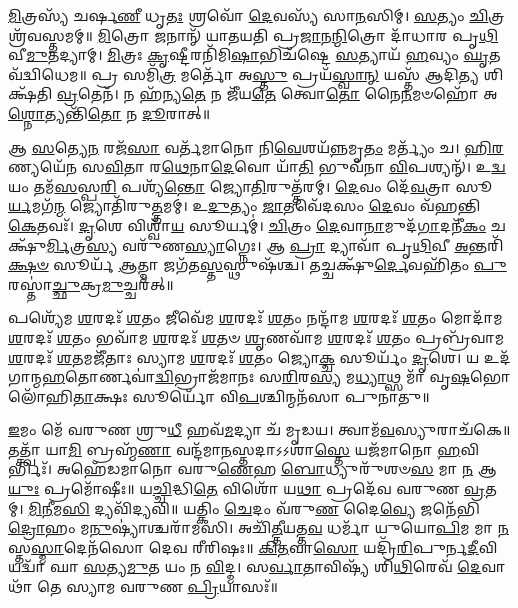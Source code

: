 \-\ul{𑌮𑌿}\-𑌤𑍍𑌰𑌸𑍍𑌯᳴ 𑌚𑌰𑍍\mbox{}𑌷\-\ul{𑌣𑍀} 𑌧𑍃\-\ul{𑌤𑌃} 𑌶𑍍𑌰𑌵𑍋᳴ \ul{𑌦𑍇}\-𑌵𑌸𑍍𑌯᳴ 𑌸𑌾\-\ul{𑌨}\-𑌸𑌿𑌮𑍍। \ul{𑌸}\-𑌤𑍍𑌯𑌂 \ul{𑌚𑌿}\-𑌤𑍍𑌰𑌶𑍍𑌰᳴𑌵𑌸𑍍𑌤𑌮𑌮𑍍॥ \ul{𑌮𑌿}\-𑌤𑍍𑌰𑍋 𑌜𑌨𑌾𑌨𑍍᳴ 𑌯𑌾𑌤𑌯𑌤𑌿 𑌪𑍍𑌰\-\ul{𑌜𑌾}\-𑌨\-\ul{𑌨𑍍𑌮𑌿}\-𑌤𑍍𑌰𑍋 𑌦𑌾᳴𑌧𑌾𑌰 𑌪𑍃\-\ul{𑌥𑌿}\-𑌵𑍀\-\ul{𑌮𑍁}\-𑌤𑌦𑍍𑌯𑌾𑌮𑍍। \ul{𑌮𑌿}\-𑌤𑍍𑌰𑌃 \ul{𑌕𑍃}\-𑌷𑍍𑌟𑍀𑌰𑌨𑌿᳴𑌮𑌿\-\ul{𑌷𑌾}\-𑌭𑌿𑌚᳴𑌷𑍍𑌟𑍇 \ul{𑌸}\-𑌤𑍍𑌯𑌾𑌯᳴ \ul{𑌹}\-𑌵𑍍𑌯𑌂 \ul{𑌘𑍃}\-𑌤𑌵᳴𑌦𑍍𑌵𑌿𑌧𑍇𑌮॥ 𑌪𑍍𑌰 𑌸𑌮𑌿᳴\-\ul{𑌤𑍍𑌰} 𑌮𑌰𑍍𑌤𑍋᳴ 𑌅\-\ul{𑌸𑍍𑌤𑍁} 𑌪𑍍𑌰𑌯᳴\-\ul{𑌸𑍍𑌵𑌾}\-\-\ul{𑌨𑍍} 𑌯𑌸𑍍𑌤᳴ 𑌆𑌦𑌿\-\ul{𑌤𑍍𑌯} 𑌶𑌿𑌕𑍍𑌷᳴𑌤𑌿 \ul{𑌵𑍍𑌰}\-𑌤𑍇𑌨᳴। 𑌨 𑌹᳴𑌨𑍍𑌯\-\ul{𑌤𑍇} 𑌨 𑌜𑍀᳴𑌯\-\ul{𑌤𑍇} 𑌤𑍍𑌵𑍋\-\ul{𑌤𑍋} 𑌨𑍈\-\ul{𑌨}\-𑌮𑍞𑌹𑍋᳴ 𑌅\-\ul{𑌶𑍍𑌨𑍋}\-𑌤𑍍𑌯𑌨𑍍𑌤𑌿᳴\-\ul{𑌤𑍋} 𑌨 \ul{𑌦𑍂}\-𑌰𑌾𑌤𑍍॥

𑌆 \ul{𑌸}\-𑌤𑍍𑌯𑍇\-\ul{𑌨} 𑌰𑌜᳴\-\ul{𑌸𑌾} 𑌵𑌰𑍍𑌤᳴𑌮𑌾𑌨𑍋 𑌨𑌿\-\ul{𑌵𑍇}\-𑌶𑌯᳴\-\ul{𑌨𑍍𑌨}\-𑌮𑍃\-\ul{𑌤𑌂} 𑌮𑌰𑍍𑌤𑍍𑌯𑌂᳴ 𑌚। \ul{𑌹𑌿}\-\-\ul{𑌰}\-𑌣𑍍𑌯𑌯𑍇᳴𑌨 𑌸\-\ul{𑌵𑌿}\-𑌤𑌾 𑌰\-\ul{𑌥𑍇}\-𑌨𑌾\-\ul{𑌦𑍇}\-𑌵𑍋 𑌯𑌾᳴\-\ul{𑌤𑌿} 𑌭𑍁𑌵᳴𑌨𑌾 \ul{𑌵𑌿}\-𑌪𑌶𑍍𑌯𑌨𑍍᳴। 𑌉\-\ul{𑌦𑍍𑌵}\-𑌯𑌂 𑌤𑌮᳴\-\ul{𑌸}\-𑌸𑍍𑌪\-\ul{𑌰𑌿} 𑌪𑌶𑍍𑌯᳴\-\ul{𑌨𑍍𑌤𑍋} 𑌜𑍍𑌯𑍋\-\ul{𑌤𑌿}\-𑌰𑍁𑌤𑍍𑌤᳴𑌰𑌮𑍍। \ul{𑌦𑍇}\-𑌵𑌂 𑌦𑍇᳴\-\ul{𑌵}\-𑌤𑍍𑌰𑌾 𑌸𑍂\-\ul{𑌰𑍍𑌯}\-𑌮𑌗᳴\-\ul{𑌨𑍍𑌮} 𑌜𑍍𑌯𑍋𑌤𑌿᳴𑌰𑍁\-\ul{𑌤𑍍𑌤}\-𑌮𑌮𑍍। 𑌉\-\ul{𑌦𑍁}\-𑌤𑍍𑌯𑌂 \ul{𑌜𑌾}\-𑌤𑌵𑍇᳴𑌦𑌸𑌂 \ul{𑌦𑍇}\-𑌵𑌂 𑌵᳴𑌹𑌨𑍍𑌤𑌿 \ul{𑌕𑍇}\-𑌤𑌵𑌃᳴। \ul{𑌦𑍃}\-𑌶𑍇 𑌵𑌿𑌶𑍍𑌵𑌾᳴\-\ul{𑌯} 𑌸𑍂𑌰𑍍𑌯𑌮𑍍॑। \ul{𑌚𑌿}\-𑌤𑍍𑌰𑌂 \ul{𑌦𑍇}\-𑌵𑌾\-\ul{𑌨𑌾}\-𑌮𑍁𑌦᳴\-\ul{𑌗𑌾}\-𑌦𑌨𑍀᳴\-\ul{𑌕𑌂} 𑌚𑌕𑍍𑌷𑍁᳴\-\ul{𑌰𑍍𑌮𑌿}\-𑌤𑍍𑌰\-\ul{𑌸𑍍𑌯} 𑌵𑌰𑍁᳴𑌣\-\ul{𑌸𑍍𑌯𑌾}\-𑌗𑍍𑌨𑍇𑌃। 𑌆 \ul{𑌪𑍍𑌰𑌾} 𑌦𑍍𑌯𑌾𑌵𑌾᳴ 𑌪𑍃\-\ul{𑌥𑌿}\-𑌵𑍀 \ul{𑌅}\-𑌨𑍍𑌤𑌰𑌿᳴\-\ul{𑌕𑍍𑌷}\-\-\ul{𑍞} 𑌸𑍂𑌰𑍍𑌯᳴ \ul{𑌆}\-𑌤𑍍𑌮𑌾 𑌜𑌗᳴𑌤\-\ul{𑌸𑍍𑌤}\-𑌸𑍍𑌥𑍁𑌷᳴𑌶𑍍𑌚। 𑌤𑌚𑍍𑌚𑌕𑍍𑌷𑍁᳴\-\ul{𑌰𑍍𑌦𑍇}\-𑌵𑌹𑌿᳴𑌤𑌂 \ul{𑌪𑍁}\-𑌰𑌸𑍍𑌤𑌾॑\-\ul{𑌚𑍍𑌛𑍁}\-𑌕𑍍𑌰\-\ul{𑌮𑍁}\-𑌚𑍍𑌚𑌰᳴𑌤𑍍॥

𑌪𑌶𑍍𑌯𑍇᳴𑌮 \ul{𑌶}\-𑌰𑌦𑌃᳴ \ul{𑌶}\-𑌤𑌂 𑌜𑍀𑌵𑍇᳴𑌮 \ul{𑌶}\-𑌰𑌦𑌃᳴ \ul{𑌶}\-𑌤𑌂 𑌨𑌨𑍍𑌦𑌾᳴𑌮 \ul{𑌶}\-𑌰𑌦𑌃᳴ \ul{𑌶}\-𑌤𑌂 𑌮𑍋𑌦𑌾᳴𑌮 \ul{𑌶}\-𑌰𑌦𑌃᳴ \ul{𑌶}\-𑌤𑌂 𑌭𑌵𑌾᳴𑌮 \ul{𑌶}\-𑌰𑌦𑌃᳴ \ul{𑌶}\-𑌤𑍞 \ul{𑌶𑍃}\-𑌣𑌵𑌾᳴𑌮 \ul{𑌶}\-𑌰𑌦𑌃᳴ \ul{𑌶}\-𑌤𑌂 𑌪𑍍𑌰𑌬𑍍𑌰᳴𑌵𑌾𑌮 \ul{𑌶}\-𑌰𑌦𑌃᳴ \ul{𑌶}\-𑌤𑌮𑌜𑍀᳴𑌤𑌾𑌃 𑌸𑍍𑌯𑌾𑌮 \ul{𑌶}\-𑌰𑌦𑌃᳴ \ul{𑌶}\-𑌤𑌂 𑌜𑍍𑌯𑍋\-\ul{𑌕𑍍𑌚} 𑌸𑍂𑌰𑍍𑌯𑌂᳴ \ul{𑌦𑍃}\-𑌶𑍇। 𑌯 𑌉𑌦᳴𑌗𑌾𑌨𑍍𑌮\-\ul{𑌹}\-𑌤𑍋𑌰𑍍𑌣𑌵𑌾॑\-\ul{𑌦𑍍𑌵𑌿}\-𑌭𑍍𑌰𑌾𑌜᳴𑌮𑌾𑌨𑌃 𑌸\-\ul{𑌰𑌿}\-𑌰\-\ul{𑌸𑍍𑌯} 𑌮\-\ul{𑌧𑍍𑌯𑌾}\-𑌥𑍍𑌸 𑌮𑌾᳴ 𑌵𑍃\-\ul{𑌷}\-𑌭𑍋 𑌲𑍋᳴𑌹𑌿\-\ul{𑌤𑌾}\-𑌕𑍍𑌷𑌃 𑌸𑍂𑌰𑍍𑌯𑍋᳴ 𑌵𑌿\-\ul{𑌪}\-𑌶𑍍𑌚𑌿𑌨𑍍𑌮𑌨᳴𑌸𑌾 𑌪𑍁𑌨𑌾𑌤𑍁॥

\-\ul{𑌇}\-𑌮𑌂 𑌮𑍇᳴ 𑌵𑌰𑍁𑌣 𑌶𑍍𑌰𑍁\-\ul{𑌧𑍀} 𑌹𑌵᳴\-\ul{𑌮}\-𑌦𑍍𑌯𑌾 𑌚᳴ 𑌮𑍃𑌡𑌯। 𑌤𑍍𑌵𑌾𑌮᳴\-\ul{𑌵}\-𑌸𑍍𑌯𑍁𑌰𑌾𑌚᳴𑌕𑍇॥ 𑌤𑌤𑍍𑌤𑍍𑌵𑌾᳴ 𑌯𑌾\-\ul{𑌮𑌿} 𑌬𑍍𑌰𑌹𑍍𑌮᳴\-\ul{𑌣𑌾} 𑌵𑌨𑍍𑌦᳴𑌮𑌾\-\ul{𑌨}\-𑌸𑍍𑌤𑌦𑌾𑌽𑌽𑌶𑌾॑\-\ul{𑌸𑍍𑌤𑍇} 𑌯𑌜᳴𑌮𑌾𑌨𑍋 \ul{𑌹}\-𑌵𑌿𑌰𑍍𑌭𑌿𑌃᳴। 𑌅𑌹𑍇᳴𑌡𑌮𑌾𑌨𑍋 𑌵𑌰𑍁\-\ul{𑌣𑍇}\-𑌹 \ul{𑌬𑍋}\-𑌧𑍍𑌯𑍁𑌰𑍁᳴𑌶𑍞\-\ul{𑌸} 𑌮𑌾 \ul{𑌨} 𑌆\-\ul{𑌯𑍁𑌃} 𑌪𑍍𑌰𑌮𑍋᳴𑌷𑍀𑌃॥
𑌯\-\ul{𑌚𑍍𑌚𑌿}\-𑌦𑍍𑌧𑌿\-\ul{𑌤𑍇} 𑌵𑌿𑌶𑍋᳴ 𑌯\-\ul{𑌥𑌾} 𑌪𑍍𑌰𑌦𑍇᳴𑌵 𑌵𑌰𑍁𑌣 \ul{𑌵𑍍𑌰}\-𑌤𑌮𑍍। \ul{𑌮𑌿}\-\-\ul{𑌨𑍀}\-𑌮\-\ul{𑌸𑌿} 𑌦𑍍𑌯𑌵𑌿᳴𑌦𑍍𑌯𑌵𑌿॥ 𑌯𑌤𑍍𑌕𑌿𑌂 \ul{𑌚𑍇}\-𑌦𑌂 𑌵᳴𑌰𑍁\-\ul{𑌣} 𑌦𑍈\-\ul{𑌵𑍍𑌯𑍇} 𑌜𑌨𑍇᳴𑌭𑌿\-\ul{𑌦𑍍𑌰𑍋}\-𑌹𑌂 𑌮\-\ul{𑌨𑍁}\-𑌷𑍍𑌯𑌾॑𑌶𑍍𑌚𑌰𑌾᳴𑌮𑌸𑌿। 𑌅𑌚𑌿᳴\-\ul{𑌤𑍍𑌤𑍀}\-𑌯𑌤𑍍𑌤\-\ul{𑌵} 𑌧𑌰𑍍𑌮𑌾᳴ 𑌯𑍁𑌯𑍋\-\ul{𑌪𑌿}\-𑌮 𑌮𑌾 \ul{𑌨}\-𑌸𑍍𑌤\-\ul{𑌸𑍍𑌮𑌾}\-𑌦𑍇𑌨᳴𑌸𑍋 𑌦𑍇𑌵 𑌰𑍀𑌰𑌿𑌷𑌃॥ \ul{𑌕𑌿}\-\-\ul{𑌤}\-𑌵𑌾\-\ul{𑌸𑍋} 𑌯𑌦𑍍𑌰𑌿᳴\-\ul{𑌰𑌿}\-𑌪𑍁𑌰𑍍𑌨\-\ul{𑌦𑍀}\-𑌵𑌿 𑌯𑌦𑍍𑌵𑌾᳴ 𑌘𑌾 \ul{𑌸}\-𑌤𑍍𑌯\-\ul{𑌮𑍁}\-𑌤 𑌯𑌂 𑌨 \ul{𑌵𑌿}\-𑌦𑍍𑌮। 𑌸\-\ul{𑌰𑍍𑌵𑌾}\-𑌤𑌾𑌵𑌿𑌷𑍍𑌯᳴ 𑌶𑌿\-\ul{𑌥𑌿}\-𑌰𑍇𑌵᳴ \ul{𑌦𑍇}\-𑌵𑌾𑌥𑌾᳴ 𑌤𑍇 𑌸𑍍𑌯𑌾𑌮 𑌵𑌰𑍁𑌣 \ul{𑌪𑍍𑌰𑌿}\-𑌯𑌾𑌸𑌃᳴॥
